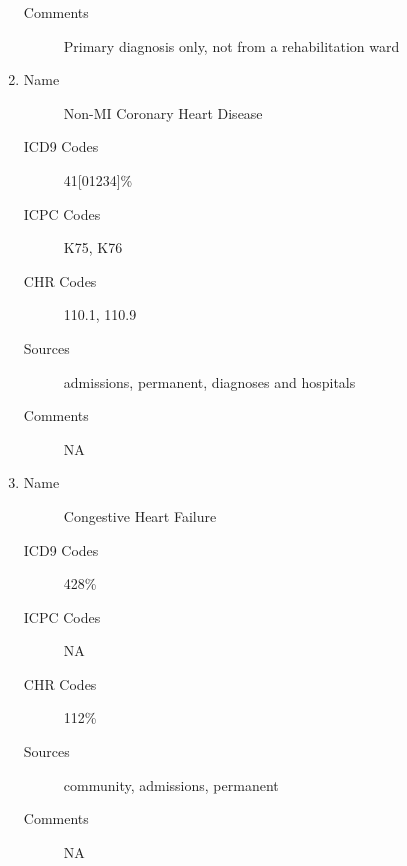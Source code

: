 \documentclass[a4paper,12pt]{article}
\begin{document}
\begin{appendices}
\begin{enumerate}
\begin{description}
   						\item[Comments] Primary diagnosis only, not from a rehabilitation ward
   					\end{description}
   					\item 
   					\begin{description}
   						\item[Name] Non-MI Coronary Heart Disease
   						\item[ICD9 Codes] 41[01234]\%
   						\item[ICPC Codes] K75, K76
   						\item[CHR Codes] 110.1, 110.9
   						\item[Sources] admissions, permanent, diagnoses  and hospitals
   						\item[Comments] NA
   					\end{description}
   					\item
   					\begin{description}
   						\item[Name] Congestive Heart Failure
   						\item[ICD9 Codes] 428\%
   						\item[ICPC Codes] NA
   						\item[CHR Codes] 112\%
   						\item[Sources] community, admissions, permanent
   						\item[Comments] NA

\end{description}
\end{enumerate}
\end{appendices}
\end{document}
